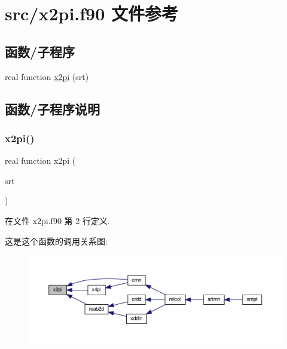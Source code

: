 \hypertarget{x2pi_8f90}{}\section{src/x2pi.f90 文件参考}
\label{x2pi_8f90}
\subsection*{函数/子程序}
\begin{DoxyCompactItemize}
\item 
real function \mbox{\hyperlink{x2pi_8f90_ac39b07cf5487782a4d75f522660e2d07}{x2pi}} (srt)
\end{DoxyCompactItemize}


\subsection{函数/子程序说明}
\mbox{\label{x2pi_8f90_ac39b07cf5487782a4d75f522660e2d07}} 
\subsubsection{\texorpdfstring{x2pi()}{x2pi()}}
{\footnotesize\ttfamily real function x2pi (\begin{DoxyParamCaption}\item[{}]{srt }\end{DoxyParamCaption})}



在文件 x2pi.\+f90 第 2 行定义.

这是这个函数的调用关系图\+:
\nopagebreak
\begin{figure}[H]
\begin{center}
\leavevmode
\includegraphics[width=350pt]{x2pi_8f90_ac39b07cf5487782a4d75f522660e2d07_icgraph}
\end{center}
\end{figure}
